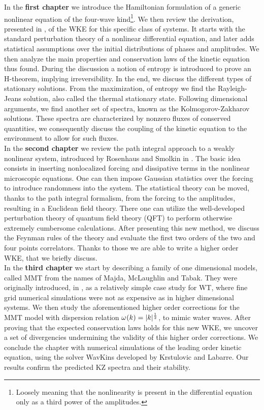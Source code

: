     In the \textbf{first chapter} we introduce the Hamiltonian formulation of a generic nonlinear equation of the four-wave kind\footnote{Loosely meaning that the nonlinearity is present in the differential equation only as a third power of the amplitudes.}. We then review the derivation, presented in \cite{Onorato2020}, of the WKE for this specific class of systems. It starts with the standard perturbation theory of a nonlinear differential equation, and later adds statistical assumptions over the initial distributions of phases and amplitudes. We then analyze the main properties and conservation laws of the kinetic equation thus found. During the discussion a notion of entropy is introduced to prove an H-theorem, implying irreversibility. In the end, we discuss the different types of stationary solutions. From the maximization, of entropy we find the Rayleigh-Jeans solution, also called the thermal stationary state. Following dimensional arguments, we find another set of spectra, known as the Kolmogorov-Zakharov solutions. These spectra are characterized by nonzero fluxes of conserved quantities, we consequently discuss the coupling of the kinetic equation to the environment to allow for such fluxes.\\
    In the \textbf{second chapter} we review the path integral approach to a weakly nonlinear system, introduced by Rosenhaus and Smolkin in \cite{Rosenhaus2023}. The basic idea consists in inserting nonlocalized forcing and dissipative terms in the nonlinear microscopic equations. One can then impose Gaussian statistics over the forcing to introduce randomness into the system. The statistical theory can be moved, thanks to the path integral formalism, from the forcing to the amplitudes, resulting in a Euclidean field theory. There one can utilize the well-developed perturbation theory of quantum field theory (QFT) to perform otherwise extremely cumbersome calculations. After presenting this new method, we discuss the Feynman rules of the theory and evaluate the first two orders of the two and four points correlators. Thanks to those we are able to write a higher order WKE, that we briefly discuss.\\
    In the \textbf{third chapter} we start by describing a family of one dimensional models, called MMT from the names of Majda, McLaughlin and Tabak. They were originally introduced, in \cite{Majda1997}, as a relatively simple case study for WT, where fine grid numerical simulations were not as expensive as in higher dimensional systems. We then study the aforementioned higher order corrections for the MMT model with dispersion relation $\omega^{} (k) = |k|^\frac{1}{2}$, to mimic water waves. After proving that the expected conservation laws holds for this new WKE, we uncover a set of divergencies undermining the validity of this higher order corrections. We conclude the chapter with numerical simulations of the leading order kinetic equation, using the solver WavKins developed by Krstulovic and Labarre. Our results confirm the predicted  KZ spectra and their stability. 



    

